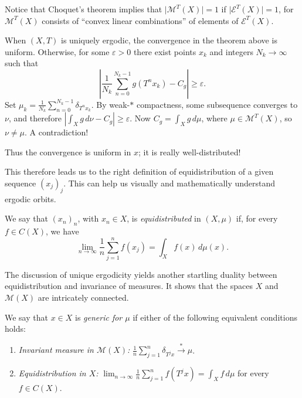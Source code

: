 \documentclass[11pt,a4paper]{article}
\begin{document}
\begin{remark}[1]
Notice that Choquet's theorem implies that $\lvert\mathcal M^T(X)\rvert=1$
if $\lvert\mathcal E^T(X)\rvert=1$, for $\mathcal M^T(X)$ consists of
``convex linear combinations'' of elements of $\mathcal E^T(X)$.
\end{remark}

\begin{remark}[2]
When $(X,T)$ is uniquely ergodic, the convergence in the theorem above is
uniform. Otherwise, for some $\varepsilon>0$ there exist points $x_k$ and
integers $N_k\to\infty$ such that
\[
  \left|\frac1{N_k}\sum_{n=0}^{N_k-1}g(T^nx_k)-C_g\right|\geq\varepsilon.
\]
Set $\mu_k=\frac1{N_k}\sum_{n=0}^{N_k-1}\delta_{T^nx_k}$. By weak-$*$ compactness,
some subsequence converges to $\nu$, and therefore
$\left|\int_X g\,d\nu-C_g\right|\geq\varepsilon$. Now
$C_g=\int_X g\,d\mu$, where $\mu\in\mathcal M^T(X)$, so $\nu\ne\mu$.
A contradiction!

Thus the convergence is uniform in $x$; it is really well-distributed!
\end{remark}

This therefore leads us to the right definition of equidistribution of a
given sequence $(x_j)_j$. This can help us visually and mathematically
understand ergodic orbits.

\setcounter{definition}{9}\begin{definition}[Equidistribution]
We say that $(x_n)_n$, with $x_n\in X$, is \emph{equidistributed} in $(X,\mu)$
if, for every $f\in C(X)$, we have
\[
  \lim_{n\to\infty}\frac1n\sum_{j=1}^n f(x_j)
  =\int_X f(x)\,d\mu(x).
\]
\end{definition}

\begin{remark}
The discussion of unique ergodicity yields another startling duality between
equidistribution and invariance of measures. It shows that the spaces $X$ and
$\mathcal M(X)$ are intricately connected.
\end{remark}



\setcounter{definition}{10}\begin{definition}
We say that $x\in X$ is \emph{generic for $\mu$} if either of the following
equivalent conditions holds:
\begin{enumerate}[label=(\roman*)]
  \item \emph{Invariant measure in $\mathcal M(X)$:}
  $\displaystyle\frac1n\sum_{j=1}^n\delta_{T^jx}
  \overset{*}{\longrightarrow}\mu$.
  \item \emph{Equidistribution in $X$:}
  $\displaystyle\lim_{n\to\infty}\frac1n\sum_{j=1}^n f(T^jx)
  =\int_Xf\,d\mu$ for every $f\in C(X)$.
\end{enumerate}
\end{definition}
\end{document}
